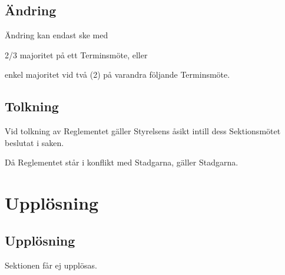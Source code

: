 \documentclass[10pt]{article}
\begin{document}
\subsection{Ändring}
Ändring kan endast ske med
\begin{alphlist}
\item 2/3 majoritet på ett Terminsmöte, eller
\item enkel majoritet vid två (2) på varandra följande Terminsmöte.
\end{alphlist}

\subsection{Tolkning}
Vid tolkning av Reglementet gäller Styrelsens åsikt intill dess Sektionsmötet
beslutat i saken.

Då Reglementet står i konflikt med Stadgarna, gäller Stadgarna.

\newpage
\section{Upplösning}
\subsection{Upplösning}
Sektionen får ej upplösas.
\newpage
\end{document}
